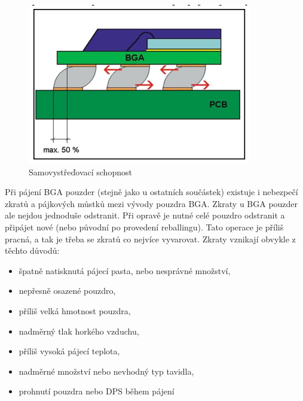\begin{figure}[h]
   \begin{center}
     \includegraphics[scale=0.6]{images/Samo.png}
   \end{center}
   \caption{Samovystřeďovací schopnost}
\end{figure}

Při pájení BGA pouzder (stejně jako u ostatních součástek) existuje i nebezpečí zkratů a pájkových můstků mezi vývody pouzdra BGA. Zkraty u BGA pouzder ale nejdou jednoduše
odstranit. Při opravě je nutné celé pouzdro odstranit a připájet nové (nebo původní po provedení reballingu). Tato operace je příliš pracná, a tak je třeba se zkratů co nejvíce vyvarovat.
Zkraty vznikají obvykle z těchto důvodů:
\begin{itemize}
\item špatně natisknutá pájecí pasta, nebo nesprávné množství,
\item nepřesně osazené pouzdro,
\item příliš velká hmotnost pouzdra,
\item nadměrný tlak horkého vzduchu,
\item příliš vysoká pájecí teplota,
\item nadměrné množství nebo nevhodný typ tavidla,
\item prohnutí pouzdra nebo DPS během pájení
\end{itemize}


